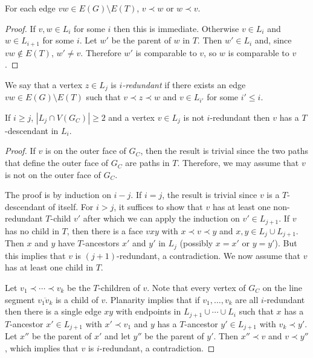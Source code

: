 \documentclass{patmorin}
\newcommand{\defin}[1]{\emph{\textcolor{brightmaroon}{#1}}}
\begin{document}
\begin{clm}
  For each edge $vw\in E(G)\setminus E(T)$, $v\prec w$ or $w\prec v$.
\end{clm}

\begin{proof}
  If $v,w\in L_i$ for some $i$ then this is immediate. Otherwise $v\in L_i$ and $w\in L_{i+1}$ for some $i$. Let $w'$ be the parent of $w$ in $T$.  Then $w'\in L_i$ and, since $vw\not\in E(T)$, $w'\neq v$.  Therefore $w'$ is comparable to $v$, so $w$ is comparable to $v$.
\end{proof}


We say that a vertex $z\in L_j$ is \defin{$i$-redundant} if there exists an edge $vw\in E(G)\setminus E(T)$ such that $v\prec z\prec w$ and $v\in L_{i'}$ for some $i'\le i$.

\begin{clm}\label{has_descendant}
  If $i\ge j$, $|L_j\cap V(G_C)|\ge 2$ and a vertex $v\in L_j$ is not $i$-redundant then $v$ has a $T$-descendant in $L_i$.
\end{clm}

\begin{proof}
  If $v$ is on the outer face of $G_C$, then the result is trivial since the two paths that define the outer face of $G_C$ are paths in $T$.  Therefore, we may assume that $v$ is not on the outer face of $G_C$.

  The proof is by induction on $i-j$.
  If $i=j$, the result is trivial since $v$ is a $T$-descendant of itself. For $i>j$, it suffices to show that $v$ has at least one non-redundant $T$-child $v'$ after which we can apply the induction on $v'\in L_{j+1}$.  If $v$ has no child in $T$, then there is a face $vxy$ with $x\prec v\prec y$ and $x,y\in L_{j}\cup L_{j+1}$. Then $x$ and $y$ have $T$-ancestors $x'$ and $y'$ in $L_j$ (possibly $x=x'$ or $y=y'$). But this implies that $v$ is $(j+1)$-redundant, a contradiction. We now assume that $v$ has at least one child in $T$.

  Let $v_1\prec\cdots\prec v_k$ be the $T$-children of $v$.  Note that every vertex of $G_C$ on the line segment $\overline{v_1v_k}$ is a child of $v$.  Planarity implies that if $v_1,\ldots,v_k$ are all $i$-redundant then there is a single edge $xy$ with endpoints in $L_{j+1}\cup\cdots\cup L_i$ such that $x$ has a $T$-ancestor $x'\in L_{j+1}$ with $x'\prec v_1$ and $y$ has a $T$-ancestor $y'\in L_{j+1}$ with $v_k\prec y'$. Let $x''$ be the parent of $x'$ and let $y''$ be the parent of $y'$.  Then $x''\prec v$ and $v\prec y''$, which implies that $v$ is $i$-redundant, a contradiction.
\end{proof}
\end{document}

